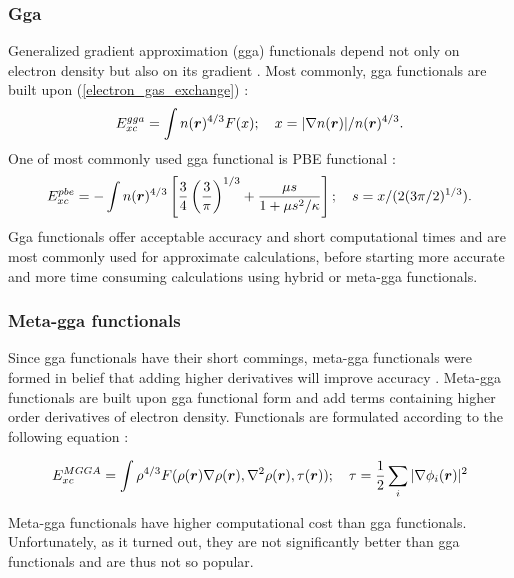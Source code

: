 \documentclass[openany, longbibliography,slovene,a4paper,12pt]{article}
\def\vec#1{\mbox{\boldmath$#1$}}
\begin{document}
\subsubsection{Gga}
Generalized gradient approximation (gga) functionals
depend not only on electron density but also on its gradient
\cite{challenges_den_fun_theor}. Most commonly, gga functionals are built upon (\ref{electron_gas_exchange}) \cite{challenges_den_fun_theor}:
\begin{equation}
  E_{xc}^{gga}=\int n(\vec r)^{4/3}F(x);\quad x=|\nabla n(\vec r)|/n(\vec r)^{4/3}.
\end{equation}
One of most commonly used gga functional is PBE functional
 \cite{challenges_den_fun_theor}:
\begin{equation}
  E_{xc}^{pbe}=-\int  n(\vec r)^{4/3}\left[ \frac{3}{4}\left(\frac{3}{\pi}\right)^{1/3} + \frac{\mu s}{1+ \mu s^2/\kappa} \right]; \quad s=x/(2(3\pi/2)^{1/3}).
\end{equation}
Gga functionals offer acceptable accuracy and short computational times and are
most commonly used for approximate calculations, before starting more accurate
and more time consuming calculations using hybrid or meta-gga functionals.

\subsubsection{Meta-gga functionals}
Since gga functionals have their short commings, meta-gga functionals were formed
in belief that adding higher derivatives will improve accuracy
\cite{challenges_den_fun_theor}. Meta-gga functionals are built upon gga
functional form and add terms containing higher order derivatives of electron
density. Functionals are formulated according to the following equation
\cite{challenges_den_fun_theor}:

\begin{equation}
  E_{xc}^{MGGA}= \int \rho^{4/3}F(\rho(\vec r) \nabla \rho(\vec r), \nabla^2 \rho(\vec r), \tau(\vec r)); \quad \tau=\frac{1}{2}\sum_i |\nabla \phi_i(\vec r)|^2
   \end{equation}

Meta-gga functionals have higher computational cost than gga functionals.
Unfortunately, as it turned out, they are not significantly better than gga
functionals and are thus not so popular.
\end{document}
